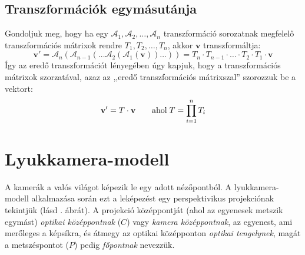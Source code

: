 \subsection{Transzformációk egymásutánja}

Gondoljuk meg, hogy ha egy $\mathcal{A}_1, \mathcal{A}_2, \ldots, \mathcal{A}_n$ transzformáció sorozatnak megfelelő transzformációs mátrixok rendre $T_1, T_2, \ldots, T_n$, akkor $\mathbf{v}$ transzformáltja:
\[\mathbf{v}' = \mathcal{A}_n(\mathcal{A}_{n-1}(\ldots \mathcal{A}_2(\mathcal{A}_1(\mathbf{v}))\ldots)) = T_n \cdot T_{n-1} \cdot \ldots \cdot T_2 \cdot T_1 \cdot \mathbf{v}\]
Így az eredő transzformációt lényegében úgy kapjuk, hogy a transzformációs mátrixok szorzatával, azaz az ,,eredő transzformációs mátrixszal'' szorozzuk be a vektort:
\[\mathbf{v}' = T \cdot \mathbf{v} \qquad \hbox{ahol} \; T = \prod_{i=1}^{n}{T_i}\]

\section{Lyukkamera-modell \label{sec:pinhole}}

A kamerák a valós világot képezik le egy adott nézőpontból. A lyukkamera-modell alkalmazása során ezt a leképezést egy perspektivikus projekciónak tekintjük \cite[2.2. fejezet]{pinhole-model} (lásd . ábrát). A projekció középpontját (ahol az egyenesek metszik egymást) \textit{optikai középpontnak} ($C$) vagy \textit{kamera középpontnak}, az egyenest, ami merőleges a képsíkra, és átmegy az optikai középponton \textit{optikai tengelynek}, magát a metszéspontot ($P$) pedig \textit{főpontnak} nevezzük.

